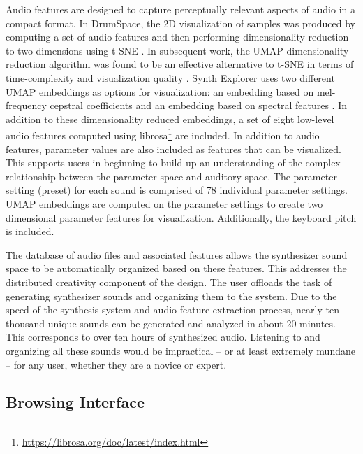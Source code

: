 Audio features are designed to capture perceptually relevant aspects of audio in a compact format. In DrumSpace, the 2D visualization of samples was produced by computing a set of audio features and then performing dimensionality reduction to two-dimensions using t-SNE \cite{turquois2016exploring, van2008visualizing}. In subsequent work, the UMAP dimensionality reduction algorithm \cite{mcinnes2020umap} was found to be an effective alternative to t-SNE in terms of time-complexity and visualization quality \cite{jiale2020visualization}. Synth Explorer uses two different UMAP embeddings as options for visualization: an embedding based on mel-frequency cepstral coefficients and an embedding based on spectral features \cite{peeters2004large}. In addition to these dimensionality reduced embeddings, a set of eight low-level audio features computed using librosa\footnote{\url{https://librosa.org/doc/latest/index.html}} are included. In addition to audio features, parameter values are also included as features that can be visualized. This supports users in beginning to build up an understanding of the complex relationship between the parameter space and auditory space. The parameter setting (preset) for each sound is comprised of 78 individual parameter settings. UMAP embeddings are computed on the parameter settings to create two dimensional parameter features for visualization. Additionally, the keyboard pitch is included.

The database of audio files and associated features allows the synthesizer sound space to be automatically organized based on these features. This addresses the distributed creativity component of the design. The user offloads the task of generating synthesizer sounds and organizing them to the system. Due to the speed of the synthesis system and audio feature extraction process, nearly ten thousand unique sounds can be generated and analyzed in about 20 minutes. This corresponds to over ten hours of synthesized audio. Listening to and organizing all these sounds would be impractical -- or at least extremely mundane -- for any user, whether they are a novice or expert. 

\subsection{Browsing Interface}

